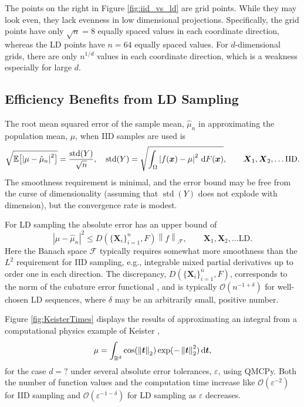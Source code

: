 \documentclass[11pt]{NSFamsart}
\DeclareMathOperator{\std}{std}
\newcommand{\reals}{{\mathbb{R}}}
\newcommand{\bbE}{\mathbb{E}}
\newcommand{\bt}{{\boldsymbol{t}}}
\newcommand{\bx}{{\boldsymbol{x}}}
\newcommand{\bX}{{\boldsymbol{X}}}
\def\dif{\textup{d}}
\newcommand{\cx}{{\Omega}}
\newcommand{\calf}{{\mathcal{F}}}
\def\abs#1{\ensuremath{\left \lvert #1 \right \rvert}}
\newcommand{\norm}[2][{}]{\ensuremath{\left \lVert #2 \right \rVert}_{#1}}
\newcommand{\Order}{\mathcal{O}}
\newcommand{\hmu}{\hat{\mu}}
\begin{document}
The points on the right in Figure \ref{fig:iid_vs_ld} are grid points. While they may look even, they lack evenness in low dimensional projections.  Specifically, the grid points have only $\sqrt{n} = 8$ equally spaced values in each coordinate direction, whereas the LD points have $n=64$ equally spaced values.  For $d$-dimensional grids, there are only $n^{1/d}$ values in each coordinate direction, which is a weakness especially for large $d$.

\subsection{Efficiency Benefits from LD Sampling}
The root mean squared error of the sample mean, $\hmu_n$ in approximating the population mean, $\mu$, when IID samples are used is 
\begin{equation}
    \sqrt{\bbE\bigl[\abs{\mu - \hmu_n}^2\bigr]} = \frac{\std(Y)}{\sqrt{n}},  \quad \std(Y) = \sqrt{\int_{\cx} \abs{f(\bx) - \mu}^2 \, \dif F(\bx)}, \qquad \bX_1, \bX_2, \ldots \text{IID}.
\end{equation}
The smoothness requirement is minimal, and the error bound may be free from the curse of dimensionality (assuming that $\std(Y)$ does not explode with dimension), but the convergence rate is modest.  

For LD sampling the absolute error has an upper bound of
\begin{equation}
    \abs{\mu - \hmu_n}^2 \le D(\{\bX_i\}_{i=1}^n, F) \norm[\calf]{f},  \qquad \bX_1, \bX_2, \ldots \text{LD}.
\end{equation}
Here the Banach space $\calf$ typically requires somewhat more smoothness than the $L^2$ requirement for IID sampling, e.g., integrable mixed partial derivatives up to order one in each direction. The discrepancy,  $D(\{\bX_i\}_{i=1}^n, F)$, corresponds to the norm of the cubature error functional \cite{Hic97a}, and is typically $\Order(n^{-1 + \delta})$ for well-chosen LD sequences, where $\delta$ may be an arbitrarily small, positive number.

Figure \ref{fig:KeisterTimes} displays the results of approximating an integral from a computational physics example of Keister \cite{Kei96},
\begin{equation}
    \mu = \int_{\reals^d} \cos( \norm[2]{\bt}) \exp(-\norm[2]{\bt}^2) \, \dif \bt,
\end{equation}
for the case $d =?$ under several absolute error tolerances, $\varepsilon$, using QMCPy.  Both the number of function values and the computation time increase like $\Order(\varepsilon^{-2})$ for IID sampling and $\Order(\varepsilon^{-1-\delta})$ for LD sampling as $\varepsilon$ decreases. 
\end{document}
